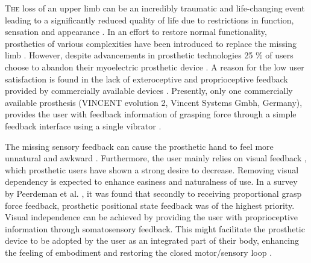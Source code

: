 

\lettrine{T}{he} loss of an upper limb can be an incredibly traumatic and life-changing event leading to a significantly reduced quality of life due to restrictions in function, sensation and appearance \cite{Schofield2014,Ostlie2011}. 
In an effort to restore normal functionality, prosthetics of various complexities have been introduced to replace the missing limb \cite{Geethanjali2016}. However, despite advancements in prosthetic technologies 25 \% of users choose to abandon their myoelectric prosthetic device \cite{Biddiss2007a}. A reason for the low user satisfaction is found in the lack of exteroceptive and proprioceptive feedback provided by commercially available devices \cite{Schofield2014,Peerdeman2011}. Presently, only one commercially available prosthesis (VINCENT evolution 2, Vincent Systems Gmbh, Germany), provides the user with feedback information of grasping force through a simple feedback interface using a single vibrator \cite{Systems2005}. 
    
%
The missing sensory feedback can cause the prosthetic hand to feel more unnatural and awkward \cite{Pamungkas2015}. Furthermore, the user mainly relies on visual feedback \cite{Pamungkas2015,Stephens-Fripp2018}, which prosthetic users have shown a strong desire to decrease. Removing visual dependency is expected to enhance easiness and naturalness of use. \cite{Atkins1996}
In a survey by Peerdeman et al. \cite{Peerdeman2011}, it was found that secondly to receiving proportional grasp force feedback, prosthetic positional state feedback was of the highest priority. Visual independence can be achieved by providing the user with proprioceptive information through somatosensory feedback. This might facilitate the prosthetic device to be adopted by the user as an integrated part of their body, enhancing the feeling of embodiment and restoring the closed motor/sensory loop \cite{Stephens-Fripp2018,Xu2016,Strbac2016,Geng2012}. 

